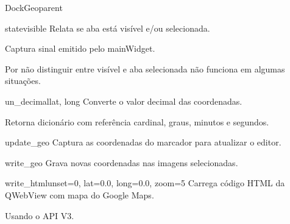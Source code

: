 \documentclass[letterpaper,10pt,portuguese]{manual}
\begin{document}
\begin{classdesc}{DockGeo}{parent}
\hypertarget{veliger.DockGeo.state}{}\begin{methoddesc}{state}{visible}
Relata se aba está visível e/ou selecionada.

Captura sinal emitido pelo mainWidget.

Por não distinguir entre visível e aba selecionada não funciona em
algumas situações.
\end{methoddesc}

\hypertarget{veliger.DockGeo.un\_decimal}{}\begin{methoddesc}{un\_decimal}{lat, long}
Converte o valor decimal das coordenadas.

Retorna dicionário com referência cardinal, graus, minutos e segundos.
\end{methoddesc}

\hypertarget{veliger.DockGeo.update\_geo}{}\begin{methoddesc}{update\_geo}{}
Captura as coordenadas do marcador para atualizar o editor.
\end{methoddesc}

\hypertarget{veliger.DockGeo.write\_geo}{}\begin{methoddesc}{write\_geo}{}
Grava novas coordenadas nas imagens selecionadas.
\end{methoddesc}

\hypertarget{veliger.DockGeo.write\_html}{}\begin{methoddesc}{write\_html}{unset=0, lat=0.0, long=0.0, zoom=5}
Carrega código HTML da QWebView com mapa do Google Maps.

Usando o API V3.
\end{methoddesc}
\end{classdesc}
\end{document}
